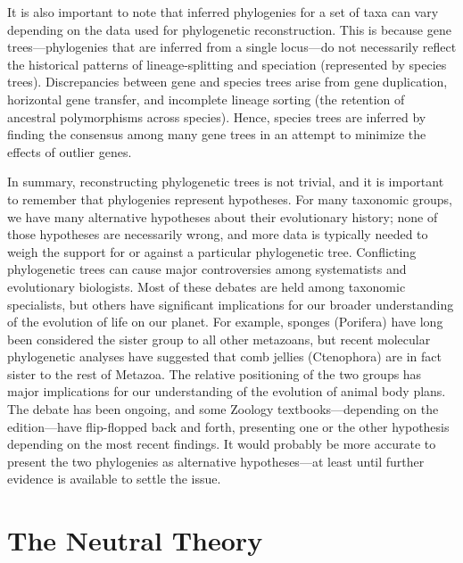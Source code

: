 \documentclass[
]{book}
\begin{document}
It is also important to note that inferred phylogenies for a set of taxa can vary depending on the data used for phylogenetic reconstruction. This is because gene trees---phylogenies that are inferred from a single locus---do not necessarily reflect the historical patterns of lineage-splitting and speciation (represented by species trees). Discrepancies between gene and species trees arise from gene duplication, horizontal gene transfer, and incomplete lineage sorting (the retention of ancestral polymorphisms across species). Hence, species trees are inferred by finding the consensus among many gene trees in an attempt to minimize the effects of outlier genes.

In summary, reconstructing phylogenetic trees is not trivial, and it is important to remember that phylogenies represent hypotheses. For many taxonomic groups, we have many alternative hypotheses about their evolutionary history; none of those hypotheses are necessarily wrong, and more data is typically needed to weigh the support for or against a particular phylogenetic tree. Conflicting phylogenetic trees can cause major controversies among systematists and evolutionary biologists. Most of these debates are held among taxonomic specialists, but others have significant implications for our broader understanding of the evolution of life on our planet. For example, sponges (Porifera) have long been considered the sister group to all other metazoans, but recent molecular phylogenetic analyses have suggested that comb jellies (Ctenophora) are in fact sister to the rest of Metazoa. The relative positioning of the two groups has major implications for our understanding of the evolution of animal body plans. The debate has been ongoing, and some Zoology textbooks---depending on the edition---have flip-flopped back and forth, presenting one or the other hypothesis depending on the most recent findings. It would probably be more accurate to present the two phylogenies as alternative hypotheses---at least until further evidence is available to settle the issue.

\hypertarget{the-neutral-theory}{%
\section{The Neutral Theory}\label{the-neutral-theory}}
\end{document}

